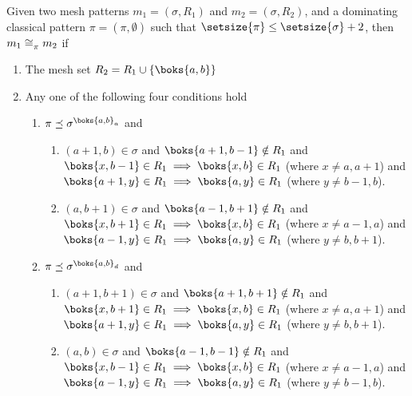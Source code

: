 \begin{proposition}
    \label{prop:dom2}
    Given two mesh patterns \(m_1 =(\sigma, R_1)\) and \(m_2 = (\sigma, R_2)\),
    and a dominating classical pattern \(\pi = (\pi,\emptyset)\) such that
    \(\setsize{\pi} \le \setsize{\sigma} + 2\), then \(m_1 \cong_{\pi}^\text{} m_2 \)
    if
    \begin{enumerate}
        \item The mesh set \(R_2 = R_1 \cup \{\boks{a,b}\}\)
        \item\label{prop:dom2:cond} Any one of the following four conditions hold \begin{enumerate}
                \item\label{prop:dom2:condc} \(\pi \preceq \sigma^{\boks{a,b}_a}\) and
                        \begin{enumerate}
                            \item \((a+1,b) \in \sigma\) and \(\boks{a+1,b-1}\notin R_1\) and \\
                                \(\boks{x,b-1}\in R_1 \implies \boks{x,b} \in R_1 \) (where \(x\neq a,a+1\)) and\\
                                  \(\boks{a+1,y}\in R_1 \implies \boks{a,y} \in R_1\) (where \(y\neq b-1,b\)).
                            \item \((a,b+1) \in \sigma\) and \(\boks{a-1,b+1}\notin R_1\) and \\
                                  \(\boks{x,b+1}\in R_1 \implies \boks{x,b} \in R_1\) (where \(x\neq a-1,a\)) and\\
                                  \(\boks{a-1,y}\in R_1 \implies \boks{a,y} \in R_1\) (where \(y\neq b,b+1\)).
                        \end{enumerate}
                    \item \(\pi \preceq \sigma^{\boks{a,b}_d}\) and
                        \begin{enumerate}
                            \item \((a+1,b+1) \in \sigma\) and \(\boks{a+1,b+1}\notin R_1\) and \\
                                  \(\boks{x,b+1}\in R_1 \implies \boks{x,b} \in R_1\) (where \(x\neq a,a+1\)) and\\
                                  \(\boks{a+1,y}\in R_1 \implies \boks{a,y} \in R_1\) (where \(y\neq b,b+1\)).
                            \item \((a,b) \in \sigma\) and \(\boks{a-1,b-1}\notin R_1\) and \\
                                  \(\boks{x,b-1}\in R_1 \implies \boks{x,b} \in R_1\) (where \(x\neq a-1,a\)) and\\
                                  \(\boks{a-1,y}\in R_1 \implies \boks{a,y} \in R_1\)  (where \(y\neq b-1,b\)).
                        \end{enumerate}
                \end{enumerate}
    \end{enumerate}
\end{proposition}
